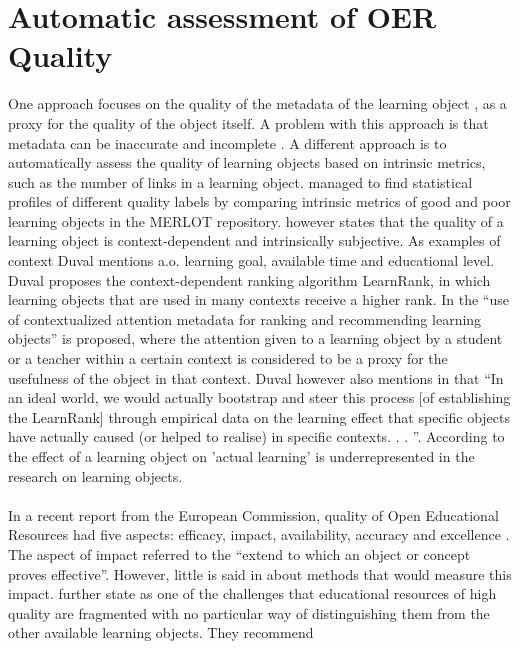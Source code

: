 \section{Automatic assessment of OER Quality}
One approach focuses on the quality of the metadata of the learning
object \citep{Ochoa2009b, Tani2013} , as a proxy for the quality of the object
itself. A problem with this approach is that metadata can be inaccurate
\citep{Cechinel2009} and incomplete \citep{Sicilia2005}. A different approach is
to automatically assess the quality of learning objects based on intrinsic
metrics, such as the number of links in a learning object. \citet{Cechinel2011}
managed to find statistical profiles of different quality labels by comparing
intrinsic metrics of good and poor learning objects in the MERLOT repository.
\citet{Duval2006} however states that the quality of a learning object is
context-dependent and intrinsically subjective. As examples of context Duval
mentions a.o. learning goal, available time and educational level. Duval
proposes the context-dependent ranking algorithm LearnRank, in which learning
objects that are used in many contexts receive a higher rank. In
\citep{Ochoa2006} the “use of contextualized attention metadata for ranking and
recommending learning objects” is proposed, where the attention given to a
learning object by a student or a teacher within a certain context is
considered to be a proxy for the usefulness of the object in that context.
Duval however also mentions in \citep{Duval2006} that “In an ideal world, we
would actually bootstrap and steer this process [of establishing the LearnRank]
through empirical data on the learning effect that specific objects have
actually caused (or helped to realise) in specific contexts. . . ”. According
to \citep{Kay2007} the effect of a learning object on ’actual learning’ is
underrepresented in the research on learning objects.\\\\
\noindent
In a recent report from the European Commission, quality of Open Educational
Resources had five aspects: efficacy, impact, availability, accuracy and
excellence \citep{Camilleri2014}. The aspect of impact referred to the “extend
to which an object or concept proves effective”. However, little is said in
\citet{Camilleri2014} about methods that would measure this impact.
\citeauthor{Camilleri2014} further state as one of the challenges that
educational resources of high quality are fragmented with no particular way of
distinguishing them from the other available learning objects. They recommend
